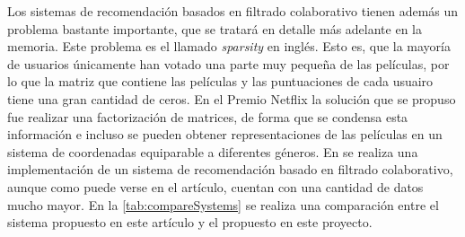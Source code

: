 Los sistemas de recomendación basados en filtrado colaborativo tienen además un problema bastante importante, que se tratará en detalle más adelante en la memoria. Este problema es el llamado \textit{sparsity} en inglés. Esto es, que la mayoría de usuarios únicamente han votado una parte muy pequeña de las películas, por lo que la matriz que contiene las películas y las puntuaciones de cada usuairo tiene una gran cantidad de ceros. En el Premio Netflix \cite{netflix} la solución que se propuso fue realizar una factorización de matrices, de forma que se condensa esta información e incluso se pueden obtener representaciones de las películas en un sistema de coordenadas equiparable a diferentes géneros. En \cite{ilhami2014film} se realiza una implementación de un sistema de recomendación basado en filtrado colaborativo, aunque como puede verse en el artículo, cuentan con una cantidad de datos mucho mayor. En la \autoref{tab:compareSystems} se realiza una comparación entre el sistema propuesto en este artículo y el propuesto en este proyecto.

